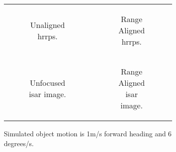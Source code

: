 \documentclass[class=report,11pt,crop=false]{standalone}
\begin{document}
    \begin{figure}[h]
        \begin{minipage}{0.60\linewidth}
            \begin{figure}
                \begin{tabular}{@{}cc@{}}
                    \begin{subfigure}{0.5\linewidth}
                        \centering
                        \resizebox{\linewidth}{!}{}
                        \caption{Unaligned \gls{hrrp}s.\label{subfig:sim_hrrp_1mps}}
                    \end{subfigure}
                    &
                    \begin{subfigure}{0.5\linewidth}
                        \centering
                        \resizebox{\linewidth}{!}{}
                        \caption{Range Aligned \gls{hrrp}s.\label{subfig:corrRA_sim_hrrp}}
                    \end{subfigure}
                    \\
                    \begin{subfigure}{0.5\linewidth}
                        \centering
                        \resizebox{\linewidth}{!}{}
                        \caption{Unfocused \gls{isar} image. \label{subfig:sim_isar_1mps}}
                    \end{subfigure}
                    &
                    \begin{subfigure}{0.5\linewidth}
                        \centering
                        \resizebox{\linewidth}{!}{}
                        \caption{Range Aligned \gls{isar} image. \label{subfig:corrRA_sim_isar}}
                    \end{subfigure}
                \end{tabular}
                \caption{Simulated object motion is 1m/s forward heading and 6 degrees/s. \label{fig:corrRA_sim}}
            \end{figure}
        \end{minipage}
        \hfill
        \begin{minipage}{0.30\linewidth}
            \begin{figure}
                \begin{tabular}{@{}c@{}}

\end{tabular}
\end{figure}
\end{minipage}
\end{figure}
\end{document}
